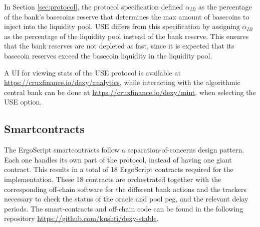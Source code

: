 \documentclass{ifcolog}
\newcommand{\dxusd}{USE}
\begin{document}
In Section \ref{sec:protocol}, the protocol specification defined $\alpha_{IB}$ as the percentage of the bank's basecoins reserve
that determines the max amount of basecoins to inject into the liquidity pool. USE differs from this specification 
by assigning $\alpha_{IB}$ as the percentage of the liquidity pool instead of the bank reserve. 
This ensures that the bank reserves are not depleted as fast, since it is expected that its basecoin reserves exceed 
the basecoin liquidity in the liquidity pool.

A UI for viewing stats of the \dxusd{} protocol is available at \url{https://cruxfinance.io/dexy/analytics}, 
while interacting with the algorithmic central bank can be done at \url{https://cruxfinance.io/dexy/mint}, 
when selecting the USE option.


\subsection{Smartcontracts}
\label{subsec:smartcontracts}
The ErgoScript smartcontracts follow a separation-of-concerns design pattern. Each one handles its own part of the protocol, 
instead of having one giant contract. This results in a total of 18 ErgoScript contracts required for the implementation. 
These 18 contracts are orchestrated together with the corresponding off-chain software for the different bank actions and
the trackers necessary to check the status of the oracle and pool peg, and the relevant delay periods.
The smart-contracts and off-chain code can be found in the following repository \url{https://github.com/kushti/dexy-stable}. 




\end{document}
